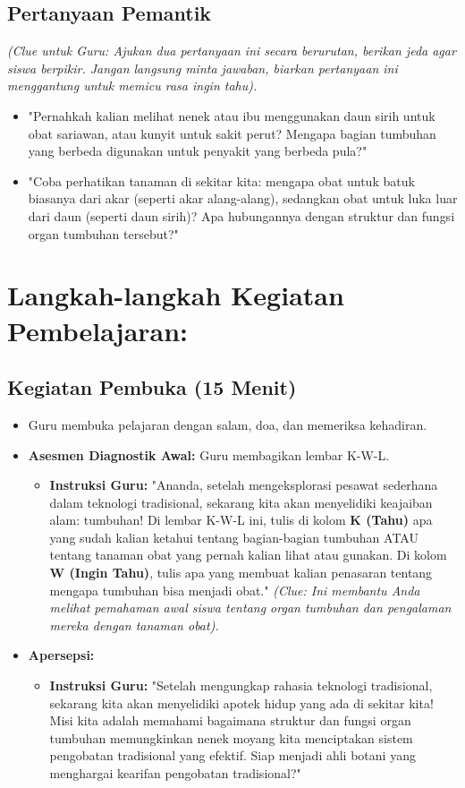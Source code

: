 \documentclass[a4paper,12pt]{article}
\begin{document}
\subsection{Pertanyaan Pemantik}
\textit{(Clue untuk Guru: Ajukan dua pertanyaan ini secara berurutan, berikan jeda agar siswa berpikir. Jangan langsung minta jawaban, biarkan pertanyaan ini menggantung untuk memicu rasa ingin tahu).}

\begin{itemize}
\item "Pernahkah kalian melihat nenek atau ibu menggunakan daun sirih untuk obat sariawan, atau kunyit untuk sakit perut? Mengapa bagian tumbuhan yang berbeda digunakan untuk penyakit yang berbeda pula?"
\item "Coba perhatikan tanaman di sekitar kita: mengapa obat untuk batuk biasanya dari akar (seperti akar alang-alang), sedangkan obat untuk luka luar dari daun (seperti daun sirih)? Apa hubungannya dengan struktur dan fungsi organ tumbuhan tersebut?"
\end{itemize}

\section{Langkah-langkah Kegiatan Pembelajaran:}

\subsection{Kegiatan Pembuka (15 Menit)}
\begin{itemize}
\item Guru membuka pelajaran dengan salam, doa, dan memeriksa kehadiran.
\item \textbf{Asesmen Diagnostik Awal:} Guru membagikan lembar K-W-L.
    \begin{itemize}
    \item \textbf{Instruksi Guru:} "Ananda, setelah mengeksplorasi pesawat sederhana dalam teknologi tradisional, sekarang kita akan menyelidiki keajaiban alam: tumbuhan! Di lembar K-W-L ini, tulis di kolom \textbf{K (Tahu)} apa yang sudah kalian ketahui tentang bagian-bagian tumbuhan ATAU tentang tanaman obat yang pernah kalian lihat atau gunakan. Di kolom \textbf{W (Ingin Tahu)}, tulis apa yang membuat kalian penasaran tentang mengapa tumbuhan bisa menjadi obat." \textit{(Clue: Ini membantu Anda melihat pemahaman awal siswa tentang organ tumbuhan dan pengalaman mereka dengan tanaman obat).}
    \end{itemize}
\item \textbf{Apersepsi:}
    \begin{itemize}
    \item \textbf{Instruksi Guru:} "Setelah mengungkap rahasia teknologi tradisional, sekarang kita akan menyelidiki apotek hidup yang ada di sekitar kita! Misi kita adalah memahami bagaimana struktur dan fungsi organ tumbuhan memungkinkan nenek moyang kita menciptakan sistem pengobatan tradisional yang efektif. Siap menjadi ahli botani yang menghargai kearifan pengobatan tradisional?"
    \end{itemize}
\end{itemize}
\end{document}
